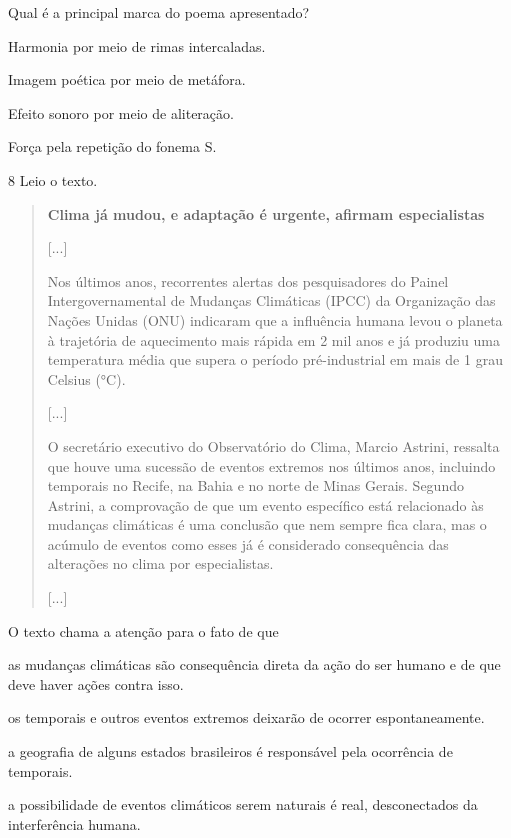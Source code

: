 Qual é a principal marca do poema apresentado?

\begin{escolha}
\item Harmonia por meio de rimas intercaladas.

\item Imagem poética por meio de metáfora.

\item Efeito sonoro por meio de aliteração.

\item Força pela repetição do fonema S.
\end{escolha}


\num{8} Leio o texto.

\begin{quote}
\textbf{Clima já mudou, e adaptação é urgente, afirmam especialistas}

{[}...{]}

Nos últimos anos, recorrentes alertas dos pesquisadores do Painel
Intergovernamental de Mudanças Climáticas (IPCC) da Organização das
Nações Unidas (ONU) indicaram que a influência humana levou o planeta à
trajetória de aquecimento mais rápida em 2 mil anos e já produziu uma
temperatura média que supera o período pré-industrial em mais de 1 grau
Celsius (°C).

{[}...{]}

O secretário executivo do Observatório do Clima, Marcio Astrini,
ressalta que houve uma sucessão de eventos extremos nos últimos anos,
incluindo temporais no Recife, na Bahia e no norte de Minas Gerais.
Segundo Astrini, a comprovação de que um evento específico está
relacionado às mudanças climáticas é uma conclusão que nem sempre fica
clara, mas o acúmulo de eventos como esses já é considerado consequência
das alterações no clima por especialistas.

{[}...{]}

\end{quote}

O texto chama a atenção para o fato de que

\begin{escolha}
\item as mudanças climáticas são consequência direta da ação do ser humano e de que deve haver ações contra isso.

\item os temporais e outros eventos extremos deixarão de ocorrer espontaneamente.

\item a geografia de alguns estados brasileiros é responsável pela ocorrência de temporais.

\item a possibilidade de eventos climáticos serem naturais é real, desconectados da interferência humana.
\end{escolha}


